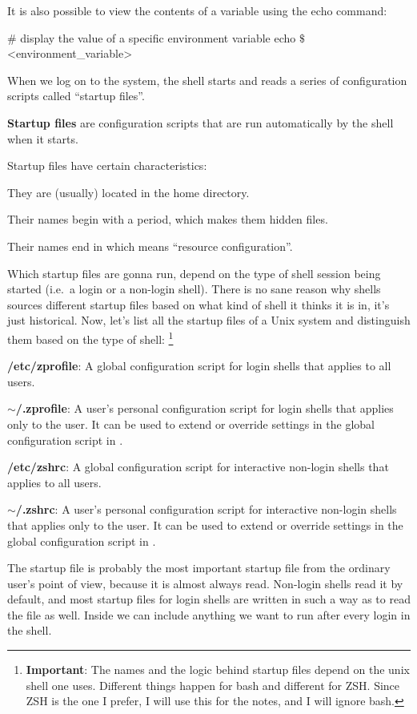 It is also possible to view the contents of a variable using the echo command:
\begin{bash}
# display the value of a specific environment variable
echo $\$$<environment_variable>
\end{bash}

When we log on to the system, the shell starts and reads a series of configuration scripts called ``startup files''.

\textbf{Startup files} are configuration scripts that are run automatically by the shell when it starts.
\ed

Startup files have certain characteristics:
\bit
\item They are (usually) located in the home directory.
\item Their names begin with a period, which makes them hidden files.
\item Their names end in  which means ``resource configuration''.
\eit

Which startup files are gonna run, depend on the type of shell session being started (i.e.\ a login or a non-login
shell). There is no sane reason why shells sources different startup files based on what kind of shell it thinks it
is in, it's just historical. Now, let's list all the startup files of a Unix system and distinguish them based on the
type of shell: \footnote{\textbf{Important}: The names and the logic behind startup files depend on the unix shell
one uses. Different things happen for bash and different for ZSH. Since ZSH is the one I prefer, I will use this for
the notes, and I will ignore bash.}
\bit
\item \textbf{/etc/zprofile}: A global configuration script for login shells that applies to all users.
\item \textbf{$\sim$/.zprofile}: A user's personal configuration script for login shells that applies only to the user. It
can be used to extend or override settings in the global configuration script in .
\item \textbf{/etc/zshrc}: A global configuration script for interactive non-login shells that applies to all users.
\item \textbf{$\sim$/.zshrc}: A user's personal configuration script for interactive non-login shells that applies only to
the user. It can be used to extend or override settings in the global configuration script in .
\eit

The  startup file is probably the most important startup file from the ordinary user's point of view,
because it is almost always read. Non-login shells read it by default, and most startup files for login shells are
written in such a way as to read the  file as well. Inside  we can include anything we
want to run after every login in the shell.

